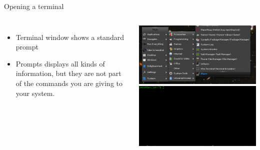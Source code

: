 \documentclass{beamer}
\begin{document}
\begin{frame}{Opening a terminal}
\begin{columns}[c]
\begin{itemize}
\item Terminal window shows a standard prompt
\item Prompts displays all kinds of information, but they are not part of the commands you are giving to your system.
\end{itemize}
\includegraphics[width=1.0\textwidth]{../imgs/terminal-open.png} \\
\includegraphics[width=1.0\textwidth]{../imgs/terminal.png}
\end{columns}
\end{frame}
\end{document}
